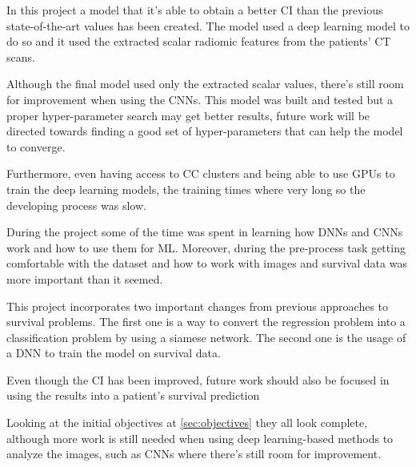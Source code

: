 

In this project a model that it's able to obtain a better \gls{CI} than the previous 
state-of-the-art values has been created. The model used a deep learning model to do so
and it used the extracted scalar radiomic features from the patients' \gls{CT} scans.

Although the final model used only the extracted scalar values, there's still room for 
improvement when using the \glspl{CNN}. This model was built and tested but a proper 
hyper-parameter search may get better results, future work will be directed towards
finding a good set of hyper-parameters that can help the model to converge.

Furthermore, even having access to \gls{CC} clusters and being able to use \glspl{GPU}
to train the deep learning models, the training times where very long so the developing
process was slow.

During the project some of the time was spent in learning how \glspl{DNN} and \glspl{CNN} 
work and how to use them for \gls{ML}. Moreover, during the pre-process task getting 
comfortable with the dataset and how to work with images and survival data was more
important than it seemed.

This project incorporates two important changes from previous approaches to survival
problems. The first one is a way to convert the regression problem into a classification
problem by using a siamese network. The second one is the usage of a \gls{DNN} to train
the model on survival data.

Even though the \gls{CI} has been improved, future work should also be focused in 
using the results into a patient's survival prediction 

Looking at the initial objectives at \autoref{sec:objectives} they all look complete,
although more work is still needed when using deep learning-based methods to analyze 
the images, such as \glspl{CNN} where there's still room for improvement.

